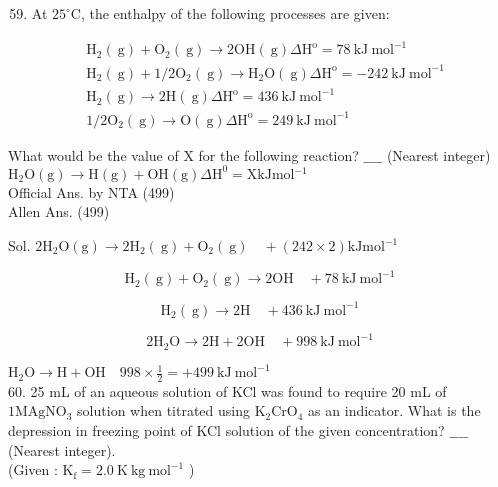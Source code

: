 \documentclass[10pt]{article}
\begin{document}
\begin{enumerate}
  \setcounter{enumi}{58}
  \item At \(25^{\circ} \mathrm{C}\), the enthalpy of the following processes are given:
\end{enumerate}

\[
\begin{aligned}
& \mathrm{H}_{2}(\mathrm{~g})+\mathrm{O}_{2}(\mathrm{~g}) \rightarrow 2 \mathrm{OH}(\mathrm{~g}) \Delta \mathrm{H}^{\mathrm{o}}=78 \mathrm{~kJ} \mathrm{~mol}^{-1} \\
& \mathrm{H}_{2}(\mathrm{~g})+1 / 2 \mathrm{O}_{2}(\mathrm{~g}) \rightarrow \mathrm{H}_{2} \mathrm{O}(\mathrm{~g}) \Delta \mathrm{H}^{\mathrm{o}}=-242 \mathrm{~kJ} \mathrm{~mol}^{-1} \\
& \mathrm{H}_{2}(\mathrm{~g}) \rightarrow 2 \mathrm{H}(\mathrm{~g}) \Delta \mathrm{H}^{\mathrm{o}}=436 \mathrm{~kJ} \mathrm{~mol}^{-1} \\
& 1 / 2 \mathrm{O}_{2}(\mathrm{~g}) \rightarrow \mathrm{O}(\mathrm{~g}) \Delta \mathrm{H}^{\mathrm{o}}=249 \mathrm{~kJ} \mathrm{~mol}^{-1}
\end{aligned}
\]

What would be the value of X for the following reaction? \(\_\_\_\_\) (Nearest integer)\\
\(\mathrm{H}_{2} \mathrm{O}(\mathrm{g}) \rightarrow \mathrm{H}(\mathrm{g})+\mathrm{OH}(\mathrm{g}) \Delta \mathrm{H}^{0}=\mathrm{X} \mathrm{kJ} \mathrm{mol}{ }^{-1}\)\\
Official Ans. by NTA (499)\\
Allen Ans. (499)

Sol. \(2 \mathrm{H}_{2} \mathrm{O}(\mathrm{g}) \rightarrow 2 \mathrm{H}_{2}(\mathrm{~g})+\mathrm{O}_{2}(\mathrm{~g}) \quad+(242 \times 2) \mathrm{kJ} \mathrm{mol}^{-1}\)

\[
\mathrm{H}_{2}(\mathrm{~g})+\mathrm{O}_{2}(\mathrm{~g}) \rightarrow 2 \mathrm{OH} \quad+78 \mathrm{~kJ} \mathrm{~mol}^{-1}
\]

\[
\mathrm{H}_{2}(\mathrm{~g}) \rightarrow 2 \mathrm{H} \quad+436 \mathrm{~kJ} \mathrm{~mol}^{-1}
\]

\[
2 \mathrm{H}_{2} \mathrm{O} \rightarrow 2 \mathrm{H}+2 \mathrm{OH} \quad+998 \mathrm{~kJ} \mathrm{~mol}^{-1}
\]

\(\mathrm{H}_{2} \mathrm{O} \rightarrow \mathrm{H}+\mathrm{OH} \quad 998 \times \frac{1}{2}=+499 \mathrm{~kJ} \mathrm{~mol}^{-1}\)\\
60. 25 mL of an aqueous solution of KCl was found to require 20 mL of \(1 \mathrm{M} \mathrm{AgNO}{ }_{3}\) solution when titrated using \(\mathrm{K}_{2} \mathrm{CrO}_{4}\) as an indicator. What is the depression in freezing point of KCl solution of the given concentration? \(\_\_\_\_\) (Nearest integer).\\
(Given : \(\mathrm{K}_{\mathrm{f}}=2.0 \mathrm{~K} \mathrm{~kg} \mathrm{~mol}^{-1}\) )
\end{document}
